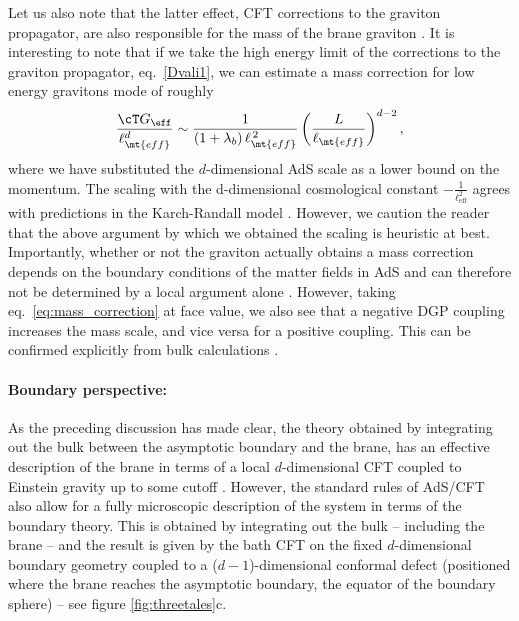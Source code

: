 Let us also note that the latter effect, \ie CFT corrections to the graviton propagator, are also responsible for the mass of the brane graviton \cite{Porrati:2001db}. It is interesting to note that if we take the high energy limit of the corrections to the graviton propagator, eq.~\eqref{Dvali1}, we can estimate a mass correction for low energy gravitons mode of roughly
\begin{align}
\label{eq:mass_correction}
\frac{\cT G_\eff}{\ell_\mt{eff}^{d}} \sim \frac{1}{(1 + \lambda_b)\, \ell_\mt{eff}^{\,2}} \left( \frac{L}{\ell_\mt{eff}}\right)^{d-2},
\end{align}
where we have substituted the $d$-dimensional AdS scale as a lower bound on the momentum. The scaling with the d-dimensional cosmological constant $- \frac 1 {\ell^2_\text{eff}}$ agrees with predictions in the Karch-Randall model \cite{Miemiec:2000eq, Schwartz:2000ip}. However, we caution the reader that the above argument by which we obtained the scaling is heuristic at best. Importantly, whether or not the graviton actually obtains a mass correction depends on the boundary conditions of the matter fields in AdS and can therefore not be determined by a local argument alone
\cite{Porrati:2001db}. However, taking eq.~\eqref{eq:mass_correction} at face value, we also see that a negative DGP coupling increases the mass scale, and vice versa for a positive coupling. This can be confirmed explicitly from bulk calculations \cite{domino}. 

\paragraph{Boundary perspective:} As the preceding discussion has made clear, the theory obtained by integrating out the bulk between the asymptotic boundary and the brane, has an effective description of the brane in terms of a local $d$-dimensional CFT coupled to Einstein gravity up to some cutoff . However, the standard rules of AdS/CFT also allow for a fully microscopic description of the system in terms of the boundary theory. This is obtained by integrating out the bulk -- including the brane -- and the result  is given by the bath CFT on the fixed $d$-dimensional boundary geometry coupled to a ($d-1$)-dimensional conformal defect (positioned where the brane reaches the asymptotic boundary, \ie the equator of the boundary sphere) -- see figure \ref{fig:threetales}c. 

